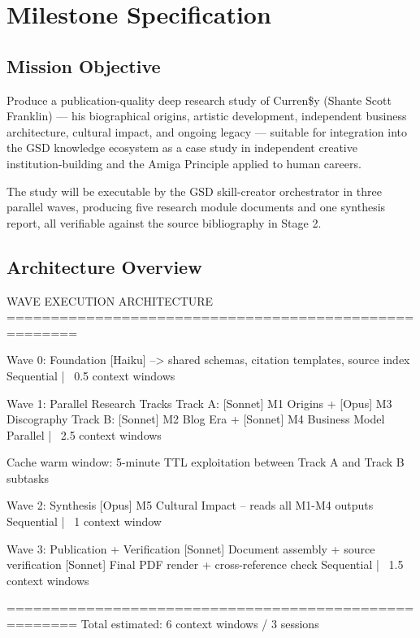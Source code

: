 \documentclass[11pt,letterpaper]{article}
\newcommand{\stageheader}[2]{%
  \noindent\colorbox{#2}{\makebox[\textwidth][l]{%
    \textcolor{white}{\bfseries\sffamily\hspace{6pt}#1\hspace{6pt}}}}%
  \vspace{0.5em}\par%
}
\begin{document}
\newpage

\stageheader{STAGE 3 --- MISSION PACKAGE}{tertiary}

\section{Milestone Specification}

\subsection{Mission Objective}

Produce a publication-quality deep research study of Curren\$y (Shante Scott Franklin) — his biographical origins, artistic development, independent business architecture, cultural impact, and ongoing legacy — suitable for integration into the GSD knowledge ecosystem as a case study in independent creative institution-building and the Amiga Principle applied to human careers.

The study will be executable by the GSD skill-creator orchestrator in three parallel waves, producing five research module documents and one synthesis report, all verifiable against the source bibliography in Stage 2.

\subsection{Architecture Overview}

\begin{center}
\begin{asciibox}
WAVE EXECUTION ARCHITECTURE
======================================================

Wave 0: Foundation
  [Haiku] --> shared schemas, citation templates, source index
  Sequential | ~0.5 context windows

Wave 1: Parallel Research Tracks
  Track A:  [Sonnet] M1 Origins  +  [Opus] M3 Discography
  Track B:  [Sonnet] M2 Blog Era +  [Sonnet] M4 Business Model
  Parallel  | ~2.5 context windows

         Cache warm window: 5-minute TTL exploitation
         between Track A and Track B subtasks

Wave 2: Synthesis
  [Opus] M5 Cultural Impact -- reads all M1-M4 outputs
  Sequential | ~1 context window

Wave 3: Publication + Verification
  [Sonnet] Document assembly + source verification
  [Sonnet] Final PDF render + cross-reference check
  Sequential | ~1.5 context windows

======================================================
Total estimated: 6 context windows / 3 sessions
\end{asciibox}
\end{center}
\end{document}
